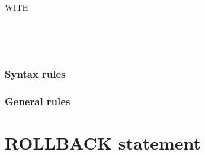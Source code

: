 \begin{syntax}
  \begin{1=}
    \recordname
    \begin{0-1}
      \begin{1=}
        \identifier \\
        \literal \\
        \functionname
      \end{1=}
    \end{0-1} \\

     \filename {}
    \begin{1=}
      \identifier \\
      \literal \\
      \functionname
    \end{1=}
  \end{1=}

  \begin{0-1}
  \end{0-1}

  \begin{0-1}
    WITH
    \begin{0-1}
    \end{0-1}
  \end{0-1}

  \begin{0+}
      \imperativestatement \\
       \imperativestatement
  \end{0+} \\

  \begin{0-1}
  \end{0-1}
\end{syntax}

\subsubsection{Syntax rules}

\subsubsection{General rules}

\section{ROLLBACK statement}

